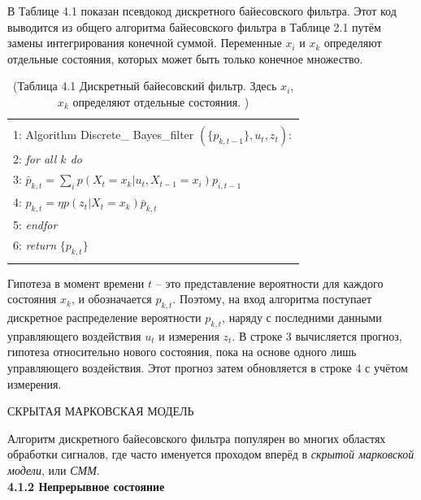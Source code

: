 \documentclass[10pt,a4paper]{article}
\begin{document}
В Таблице 4.1 показан псевдокод дискретного байесовского фильтра. Этот код выводится из общего алгоритма байесовского фильтра в Таблице 2.1 путём замены интегрирования конечной суммой. Переменные $x_i$ и $x_k$ определяют отдельные состояния, которых может быть только конечное множество. 

\begin{table}[H]
\begin{center}
\begin{tabular}{|l|}
\hline
{}\\
1: \hspace{3mm} Algorithm Discrete\_ Bayes\_filter $(\{p_{k,t-1}\},u_t,z_t):$ \\
2: \hspace{7mm}\textit{for all $k$ do} \\
3: \hspace{12mm} $\bar{p}_{k,t}=\sum_i p(X_t=x_k|u_t,X_{t-1}=x_i)p_{i,t-1}$\\
4: \hspace{12mm} $p_{k,t}=\eta p(z_t|X_t=x_k)\bar{p}_{k,t}$\\
5: \hspace{7mm}\textit{endfor} \\
6:\hspace{7mm}
\textit{return} $\{p_{k,t}\}$\\
{}\\
\hline
\end{tabular}
\caption{(Таблица 4.1 Дискретный байесовский фильтр. Здесь $x_i$, $x_k$ определяют отдельные состояния. )}
\end{center}
\end{table}

Гипотеза в момент времени $t$ – это представление вероятности для каждого состояния $x_k$, и обозначается $p_{k,t}$. Поэтому, на вход алгоритма поступает дискретное распределение вероятности ${p_{k,t}}$, наряду с последними данными управляющего воздействия $u_t$ и измерения $z_t$. В строке 3 вычисляется прогноз, гипотеза относительно нового состояния, пока на основе одного лишь управляющего воздействия. Этот прогноз затем обновляется в строке 4 с учётом измерения.

СКРЫТАЯ МАРКОВСКАЯ МОДЕЛЬ

Алгоритм дискретного байесовского фильтра популярен во многих областях обработки сигналов, где часто именуется проходом вперёд в\textit{ скрытой марковской модели}, или \textit{СММ}.\\

\textbf{4.1.2 Непрерывное состояние}\\
\end{document}
